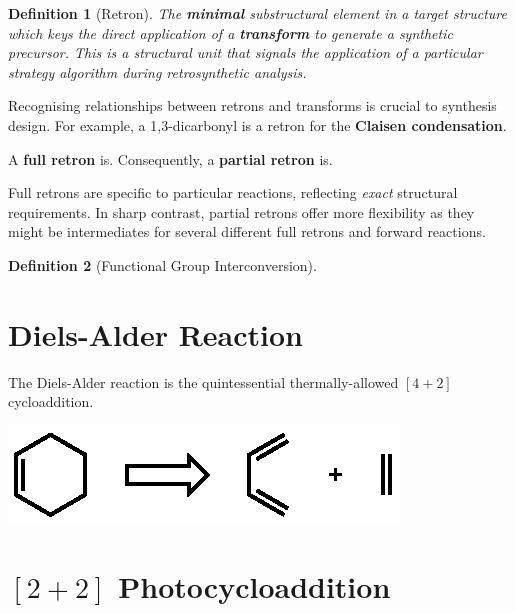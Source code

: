 \documentclass[a4paper]{tufte-handout}
\newtheorem{definition}{Definition}
\begin{document}
\begin{definition}[Retron]
  The \textbf{minimal} substructural element in a target structure which keys the direct application of a \textbf{transform} to generate a synthetic precursor.
  This is a structural unit that signals the application of a particular strategy algorithm during retrosynthetic analysis.
\end{definition}

Recognising relationships between retrons and transforms is crucial to synthesis design. For example, a 1,3-dicarbonyl 
is a retron for the \textbf{Claisen condensation}.

A \textbf{full retron} is. Consequently, a \textbf{partial retron} is.

Full retrons are specific to particular reactions, reflecting \textit{exact} structural
requirements. In sharp contrast, partial retrons offer more flexibility
as they might be intermediates for several different full retrons and 
forward reactions.

\begin{definition}[Functional Group Interconversion]
  
\end{definition}

\section*{Diels-Alder Reaction}

The Diels-Alder reaction is the quintessential thermally-allowed $[4+2]$ cycloaddition.

\begin{marginfigure}%
  \includegraphics[width=\linewidth]{diels-alder-transform}
  \caption{Diels-Alder transform. Shown here is the simplest Diels-Alder reaction: the formation of cyclohexene from 1,3-butadiene and ethylene.}
  \label{fig:marginfig}
\end{marginfigure}

\section*{$[2+2]$ Photocycloaddition}



\end{document}
